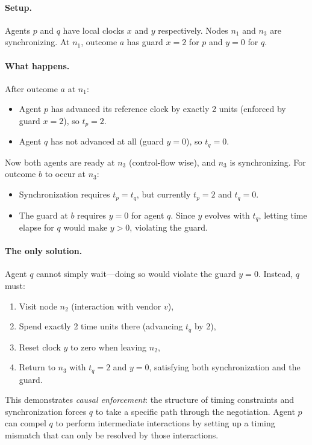 \begin{example}
\paragraph{Setup.} Agents $p$ and $q$ have local clocks $x$ and $y$ respectively. Nodes $n_1$ and $n_3$ are synchronizing. At $n_1$, outcome $a$ has guard $x = 2$ for $p$ and $y = 0$ for $q$.

\paragraph{What happens.} After outcome $a$ at $n_1$:
\begin{itemize}
\item Agent $p$ has advanced its reference clock by exactly 2 units (enforced by guard $x = 2$), so $t_p = 2$.
\item Agent $q$ has not advanced at all (guard $y = 0$), so $t_q = 0$.
\end{itemize}

Now both agents are ready at $n_3$ (control-flow wise), and $n_3$ is synchronizing. For outcome $b$ to occur at $n_3$:
\begin{itemize}
\item Synchronization requires $t_p = t_q$, but currently $t_p = 2$ and $t_q = 0$.
\item The guard at $b$ requires $y = 0$ for agent $q$. Since $y$ evolves with $t_q$, letting time elapse for $q$ would make $y > 0$, violating the guard.
\end{itemize}

\paragraph{The only solution.} Agent $q$ cannot simply wait—doing so would violate the guard $y = 0$. Instead, $q$ must:
\begin{enumerate}
\item Visit node $n_2$ (interaction with vendor $v$),
\item Spend exactly 2 time units there (advancing $t_q$ by 2),
\item Reset clock $y$ to zero when leaving $n_2$,
\item Return to $n_3$ with $t_q = 2$ and $y = 0$, satisfying both synchronization and the guard.
\end{enumerate}

This demonstrates \emph{causal enforcement}: the structure of timing constraints and synchronization forces $q$ to take a specific path through the negotiation. Agent $p$ can compel $q$ to perform intermediate interactions by setting up a timing mismatch that can only be resolved by those interactions.
\end{example}

